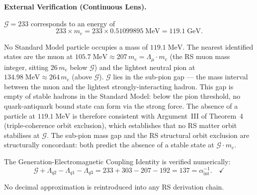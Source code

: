\documentclass[11pt, letterpaper]{article}
\theoremstyle{definition}
\theoremstyle{plain}
\begin{document}
\begin{verifybox}
\textbf{External Verification (Continuous Lens).}

$\mathcal{G} = 233$ corresponds to an energy of
\[
    233 \times m_e = 233 \times 0.51099895\;\mathrm{MeV} = 119.1\;\mathrm{GeV}.
\]

No Standard Model particle occupies a mass of $119.1\;\mathrm{MeV}$. The nearest
identified states are the muon at $105.7\;\mathrm{MeV} \approx 207\,m_e = \Lambda_\mu
\cdot m_e$ (the RS muon mass integer, sitting $26\,m_e$ below $\mathcal{G}$) and the
lightest neutral pion at $134.98\;\mathrm{MeV} \approx 264\,m_e$ (above $\mathcal{G}$).
$\mathcal{G}$ lies in the sub-pion gap — the mass interval between the muon and the
lightest strongly-interacting hadron. This gap is empty of stable hadrons in the
Standard Model: below the pion threshold, no quark-antiquark bound state can form via
the strong force. The absence of a particle at $119.1\;\mathrm{MeV}$ is therefore
consistent with Argument~III of Theorem~4 (triple-coherence orbit exclusion), which
establishes that no RS matter orbit stabilises at $\mathcal{G}$. The sub-pion mass
gap and the RS structural orbit exclusion are structurally concordant: both predict
the absence of a stable state at $\mathcal{G} \cdot m_e$.

The Generation-Electromagnetic Coupling Identity is verified numerically:
\[
    \mathcal{G} + \Lambda_{q2} - \Lambda_{q1} - \Lambda_{q3}
    = 233 + 303 - 207 - 192 = 137 = \alpha^{-1}_\mathrm{int}. \quad \checkmark
\]

No decimal approximation is reintroduced into any RS derivation chain.
\end{verifybox}
\end{document}
